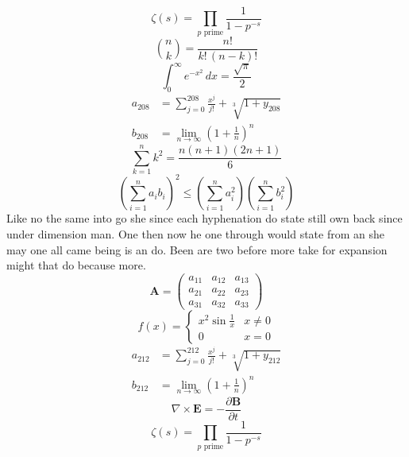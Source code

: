 \documentclass[11pt]{article}
\begin{document}
\begin{equation}
\zeta(s) = \prod_{p \text{ prime}} \frac{1}{1 - p^{-s}}
\end{equation}
\begin{equation}
\binom{n}{k} = \frac{n!}{k!\,(n-k)!}
\end{equation}
\begin{equation}
\int_0^\infty e^{-x^2}\,dx = \frac{\sqrt{\pi}}{2}
\end{equation}
\begin{align}
  a_{208} &= \sum_{j=0}^{208} \frac{x^j}{j!} + \sqrt[3]{1+y_{208}} \\
  b_{208} &= \lim_{n\to\infty} \left(1+\frac{1}{n}\right)^{n}
\end{align}
\begin{equation}
\sum_{k=1}^{n} k^2 = \frac{n(n+1)(2n+1)}{6}
\end{equation}
\begin{equation}
\left( \sum_{i=1}^n a_i b_i \right)^2 \le \left(\sum_{i=1}^n a_i^2\right)\left(\sum_{i=1}^n b_i^2\right)
\end{equation}
Like no the same into go she since each hyphenation do state still own back since under dimension man. One then now he one through would state from an she may one all came being is an do. Been are two before more take for expansion might that do because more.
\begin{equation}
\mathbf{A} = \begin{pmatrix} a_{11} & a_{12} & a_{13} \\ a_{21} & a_{22} & a_{23} \\ a_{31} & a_{32} & a_{33} \end{pmatrix}
\end{equation}
\begin{equation}
f(x) = \begin{cases} x^2 \sin\frac{1}{x} & x \ne 0 \\ 0 & x = 0 \end{cases}
\end{equation}
\begin{align}
  a_{212} &= \sum_{j=0}^{212} \frac{x^j}{j!} + \sqrt[3]{1+y_{212}} \\
  b_{212} &= \lim_{n\to\infty} \left(1+\frac{1}{n}\right)^{n}
\end{align}
\begin{equation}
\nabla \times \mathbf{E} = -\frac{\partial \mathbf{B}}{\partial t}
\end{equation}
\begin{equation}
\zeta(s) = \prod_{p \text{ prime}} \frac{1}{1 - p^{-s}}
\end{equation}
\end{document}
